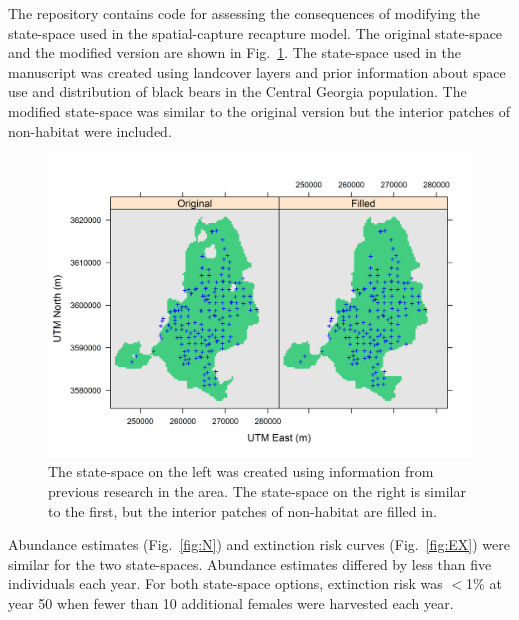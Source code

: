 \documentclass[12pt]{article}
\begin{document}
\clearpage

The repository contains code for assessing the consequences of
modifying the state-space used in the spatial-capture recapture model.
The original state-space and the modified version are shown in  
Fig.~\ref{fig:2ss}. The state-space used in the manuscript was
created using landcover layers and prior information about 
space use and distribution of black bears in the Central Georgia
population. The modified state-space was similar to the original
version but the interior patches of non-habitat were included.  

\begin{figure}[h]
  \centering
  \includegraphics[width=\textwidth]{figs/state-spaces}
  \caption{The state-space on the left was created using information
    from previous research in the area. The state-space on the right
    is similar to the first, but the interior patches of non-habitat
    are filled in.}   
  \label{fig:2ss}
\end{figure}

\clearpage


Abundance estimates (Fig.~\ref{fig:N}) and extinction risk curves
(Fig.~\ref{fig:EX}) were similar for the two state-spaces. Abundance
estimates differed by less than five individuals each year. For both
state-space options, extinction risk was $<$1\% at year 50 when fewer
than 10 additional females were harvested each year. 
\end{document}
